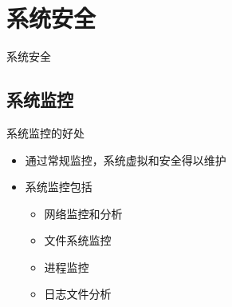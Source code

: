 %
%
%
%

\section{系统安全}
\begin{frame}{系统安全}
\tableofcontents[currentsection]
\end{frame}
 
 \subsection{系统监控}

\begin{frame}{系统监控的好处}
\begin{itemize}
\item 通过常规监控，系统虚拟和安全得以维护
\item 系统监控包括

\begin{itemize}
\item 网络监控和分析
\item 文件系统监控
\item 进程监控
\item 日志文件分析
\end{itemize}
\end{itemize}

\end{frame} 

